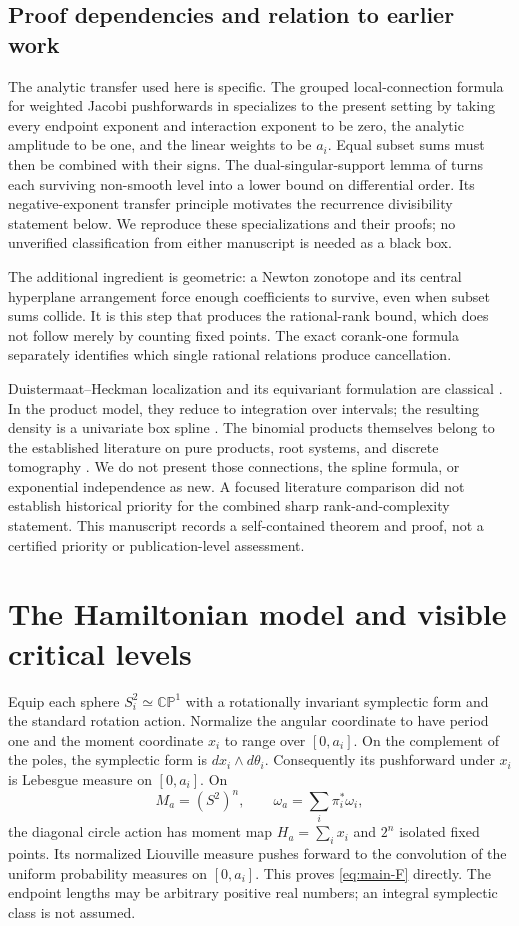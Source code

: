 \documentclass[11pt]{article}
\theoremstyle{definition}
\theoremstyle{remark}
\newcommand{\CP}{\mathbb {CP}}
\numberwithin{equation}{section}
\begin{document}
\subsection{Proof dependencies and relation to earlier work}
The analytic transfer used here is specific. The grouped local-connection
formula for weighted Jacobi pushforwards in \cite[Part IX, theorem
``Weighted graphical Jacobi local connections'']{KeioUnified} specializes
to the present setting by taking every endpoint exponent and interaction
exponent to be zero, the analytic amplitude to be one, and the linear
weights to be $a_i$. Equal subset sums must then be combined with their
signs. The dual-singular-support lemma of \cite[Section 3.1]{KeioVertex}
turns each surviving non-smooth level into a lower bound on differential
order. Its negative-exponent transfer principle motivates the recurrence
divisibility statement below. We reproduce these specializations and
their proofs; no unverified classification from either manuscript is
needed as a black box.

The additional ingredient is geometric: a Newton zonotope and its
central hyperplane arrangement force enough coefficients to survive,
even when subset sums collide. It is this step that produces the
rational-rank bound, which does not follow merely by counting fixed
points. The exact corank-one formula separately identifies which single
rational relations produce cancellation.

Duistermaat--Heckman localization and its equivariant formulation are
classical \cite{DH,AB}. In the product model, they reduce to integration
over intervals; the resulting density is a univariate box spline
\cite{BoxSplines}. The binomial products themselves belong to the
established literature on pure products, root systems, and discrete
tomography \cite{MaltbyPTE,MaltbyRoots,AlpersLarman}. We do not present
those connections, the spline formula, or exponential independence as
new. A focused literature comparison did not establish historical
priority for the combined sharp rank-and-complexity statement. This
manuscript records a self-contained theorem and proof, not a certified
priority or publication-level assessment.

\section{The Hamiltonian model and visible critical levels}
\label{sec:geometry}
Equip each sphere $S^2_i\simeq\CP^1$ with a rotationally invariant
symplectic form and the standard rotation action. Normalize the angular
coordinate to have period one and the moment coordinate $x_i$ to range
over $[0,a_i]$. On the complement of the poles, the symplectic form is
$dx_i\wedge d\theta_i$. Consequently its pushforward under $x_i$ is
Lebesgue measure on $[0,a_i]$. On
\[
 M_a=(S^2)^n,\qquad \omega_a=\sum_i\pi_i^*\omega_i,
\]
the diagonal circle action has moment map $H_a=\sum_i x_i$ and $2^n$
isolated fixed points. Its normalized Liouville measure pushes forward
to the convolution of the uniform probability measures on $[0,a_i]$.
This proves \eqref{eq:main-F} directly. The endpoint lengths may be
arbitrary positive real numbers; an integral symplectic class is not
assumed.
\end{document}

